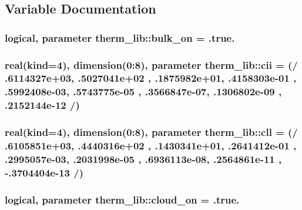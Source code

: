 \subsection{Variable Documentation}
\hypertarget{namespacetherm__lib_a74e34c886f54fe2ca038c4f301d31beb}{}
\subsubsection[{bulk\+\_\+on}]{\setlength{\rightskip}{0pt plus 5cm}logical, parameter therm\+\_\+lib\+::bulk\+\_\+on = .true.}\label{namespacetherm__lib_a74e34c886f54fe2ca038c4f301d31beb}
\hypertarget{namespacetherm__lib_a80e96618552a9428c5819e0f9fcbc242}{}
\subsubsection[{cii}]{\setlength{\rightskip}{0pt plus 5cm}real(kind=4), dimension(0\+:8), parameter therm\+\_\+lib\+::cii = (/ .\+6114327e+03, .\+5027041e+02 , .\+1875982e+01, .\+4158303e-\/01 , .\+5992408e-\/03, .\+5743775e-\/05 , .\+3566847e-\/07, .\+1306802e-\/09 , .\+2152144e-\/12 /)}\label{namespacetherm__lib_a80e96618552a9428c5819e0f9fcbc242}
\hypertarget{namespacetherm__lib_a0fd2184c73856d805e115f4a13068150}{}
\subsubsection[{cll}]{\setlength{\rightskip}{0pt plus 5cm}real(kind=4), dimension(0\+:8), parameter therm\+\_\+lib\+::cll = (/ .\+6105851e+03, .\+4440316e+02 , .\+1430341e+01, .\+2641412e-\/01 , .\+2995057e-\/03, .\+2031998e-\/05 , .\+6936113e-\/08, .\+2564861e-\/11 , -\/.\+3704404e-\/13 /)}\label{namespacetherm__lib_a0fd2184c73856d805e115f4a13068150}
\hypertarget{namespacetherm__lib_a7761745573e57bcf109498771693bc48}{}
\subsubsection[{cloud\+\_\+on}]{\setlength{\rightskip}{0pt plus 5cm}logical, parameter therm\+\_\+lib\+::cloud\+\_\+on = .true.}\label{namespacetherm__lib_a7761745573e57bcf109498771693bc48}
\hypertarget{namespacetherm__lib_ac6f7b02070a3ef627b731ecd1b7afb1a}{}
